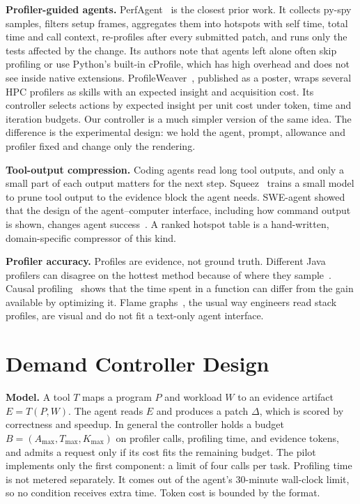 \documentclass[conference]{IEEEtran}
\begin{document}
\textbf{Profiler-guided agents.}
PerfAgent~\cite{deng2026perfagent} is the closest prior work. It collects
py-spy samples, filters setup frames, aggregates them into hotspots with self
time, total time and call context, re-profiles after every submitted patch,
and runs only the tests affected by the change. Its authors note that agents
left alone often skip profiling or use Python's built-in cProfile, which has
high overhead and does not see inside native extensions.
ProfileWeaver~\cite{ding2026profileweaver}, published as a poster, wraps
several HPC profilers as skills with an expected insight and acquisition cost.
Its controller selects actions by expected insight per unit cost under token,
time and iteration budgets. Our controller is a much simpler version of the
same idea. The difference is the experimental design: we hold the agent,
prompt, allowance and profiler fixed and change only the rendering.

\textbf{Tool-output compression.}
Coding agents read long tool outputs, and only a small part of each output
matters for the next step. Squeez~\cite{kovacs2026squeez} trains a small model
to prune tool output to the evidence block the agent needs. SWE-agent showed
that the design of the agent--computer interface, including how command output
is shown, changes agent success~\cite{yang2024sweagent}. A ranked hotspot table
is a hand-written, domain-specific compressor of this kind.

\textbf{Profiler accuracy.}
Profiles are evidence, not ground truth. Different Java profilers can disagree
on the hottest method because of where they sample~\cite{mytkowicz2010evaluating}.
Causal profiling~\cite{curtsinger2015coz} shows that the time spent in a
function can differ from the gain available by optimizing it. Flame
graphs~\cite{gregg2016flame}, the usual way engineers read stack profiles,
are visual and do not fit a text-only agent interface.

\section{Demand Controller Design}
\label{sec:design}

\textbf{Model.} A tool $T$ maps a program $P$ and workload $W$ to an evidence
artifact $E=T(P,W)$. The agent reads $E$ and produces a patch $\Delta$, which is
scored by correctness and speedup. In general the controller holds a budget
$B=(A_{\max},T_{\max},K_{\max})$ on profiler calls, profiling time, and evidence
tokens, and admits a request only if its cost fits the remaining budget. The
pilot implements only the first component: a limit of four calls per task.
Profiling time is not metered separately. It comes out of the agent's 30-minute
wall-clock limit, so no condition receives extra time. Token cost is bounded by
the format.
\end{document}

